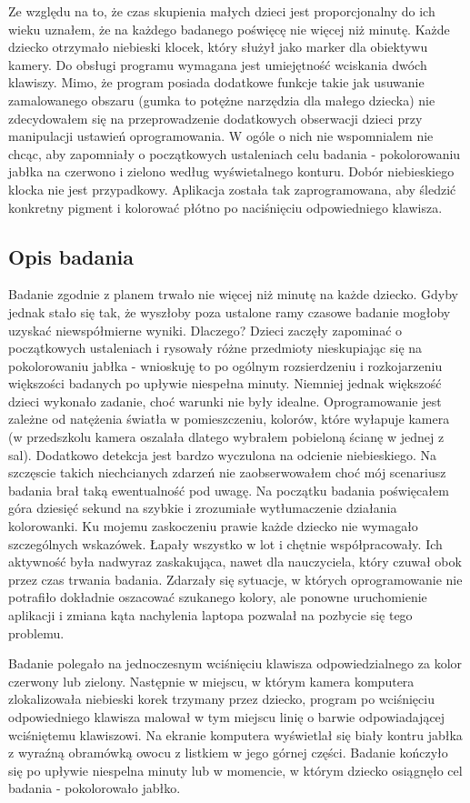 \documentclass{article}
\begin{document}
	\par
	Ze względu na to, że czas skupienia małych dzieci jest proporcjonalny do ich wieku uznałem, że na każdego badanego poświęcę nie więcej niż minutę. Każde dziecko otrzymało niebieski klocek, który służył jako marker dla obiektywu kamery. Do obsługi programu wymagana jest umiejętność wciskania dwóch klawiszy. Mimo, że program posiada dodatkowe funkcje takie jak usuwanie zamalowanego obszaru (gumka to potężne narzędzia dla małego dziecka) nie zdecydowałem się na przeprowadzenie dodatkowych obserwacji dzieci przy manipulacji ustawień oprogramowania. W ogóle o nich nie wspomnialem nie chcąc, aby zapomniały o początkowych ustaleniach celu badania - pokolorowaniu jabłka na czerwono i zielono według wyświetalnego konturu. Dobór niebieskiego klocka nie jest przypadkowy. Aplikacja została tak zaprogramowana, aby śledzić konkretny pigment i kolorować płótno po naciśnięciu odpowiedniego klawisza.
	
	
	\subsection{Opis badania}
	
\par Badanie zgodnie z planem trwało nie więcej niż minutę na każde dziecko. Gdyby jednak stało się tak, że wyszłoby poza ustalone ramy czasowe badanie mogłoby uzyskać niewspółmierne wyniki. Dlaczego? Dzieci zaczęły zapominać o początkowych ustaleniach i rysowały różne przedmioty nieskupiając się na pokolorowaniu jabłka - wnioskuję to po ogólnym rozsierdzeniu i rozkojarzeniu większości badanych po upływie niespełna minuty. Niemniej jednak większość dzieci wykonało zadanie, choć warunki nie były idealne. Oprogramowanie jest zależne od natężenia światła w pomieszczeniu, kolorów, które wyłapuje kamera (w przedszkolu kamera oszalała dlatego wybrałem pobieloną ścianę w jednej z sal). Dodatkowo detekcja jest bardzo wyczulona na odcienie niebieskiego. Na szczęscie takich niechcianych zdarzeń nie zaobserwowałem choć mój scenariusz badania brał taką ewentualność pod uwagę. Na początku badania poświęcałem góra dziesięć sekund na szybkie i zrozumiałe wytłumaczenie działania kolorowanki. Ku mojemu zaskoczeniu prawie każde dziecko nie wymagało szczególnych wskazówek. Łapały wszystko w lot i chętnie współpracowały. Ich aktywność była nadwyraz zaskakująca, nawet dla nauczyciela, który czuwał obok przez czas trwania badania. Zdarzały się sytuacje, w których oprogramowanie nie potrafiło dokładnie oszacować szukanego kolory, ale ponowne uruchomienie aplikacji i zmiana kąta nachylenia laptopa pozwalał na pozbycie się tego problemu.
	\par Badanie polegało na jednoczesnym wciśnięciu klawisza odpowiedzialnego za kolor czerwony lub zielony. Następnie w miejscu, w którym kamera komputera zlokalizowała niebieski korek trzymany przez dziecko, program po wciśnięciu odpowiedniego klawisza malował w tym miejscu linię o barwie odpowiadającej wciśniętemu klawiszowi. Na ekranie komputera wyświetlał się biały kontru jabłka z wyraźną obramówką owocu z listkiem w jego górnej części. Badanie kończyło się po upływie niespelna minuty lub w momencie, w którym dziecko osiągnęło cel badania - pokolorowało jabłko.
	
\end{document}
